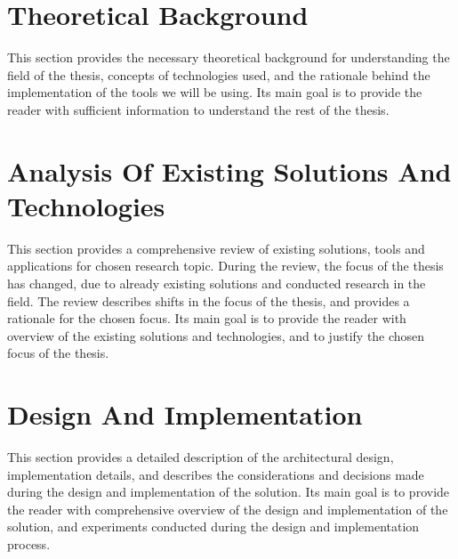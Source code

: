 
\section{Theoretical Background}\label{sec:theoretical-background}

This section provides the necessary theoretical background for understanding the
field of the thesis, concepts of technologies used, and the rationale behind the
implementation of the tools we will be using.
Its main goal is to provide the reader with sufficient information to understand
the rest of the thesis.




\clearpage

\section{Analysis Of Existing Solutions And Technologies}

This section provides a comprehensive review of existing solutions, tools and
applications for chosen research topic.
During the review, the focus of the thesis has changed, due to already existing
solutions and conducted research in the field. The review describes shifts in
the focus of the thesis, and provides a rationale for the chosen focus.
Its main goal is to provide the reader with overview of the existing solutions
and technologies, and to justify the chosen focus of the thesis.




\clearpage

\section{Design And Implementation}

This section provides a detailed description of the architectural design,
implementation details, and describes the considerations and decisions made
during the design and implementation of the solution.
Its main goal is to provide the reader with comprehensive overview of the design
and implementation of the solution, and experiments conducted during the design
and implementation process.



